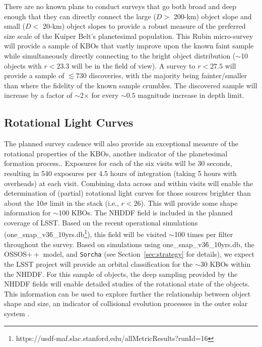 \documentclass[modern,linenumbers,trackchanges,preprint]{aastex631}
\begin{document}
There are no known plans to conduct surveys that go both broad and deep enough that they can directly connect the large ($D>$ 200-km) object slope and small ($D<$ 20-km) object slopes to provide a robust measure of the preferred size scale of the Kuiper Belt's planetesimal population.
This Rubin micro-survey will provide a sample of KBOs that vastly improve upon the known faint sample while simultaneously directly connecting to the bright object distribution ($\sim$10 objects with $r<23.3$ will be in the field of view). A survey to $r<27.5$ will provide a sample of $\lesssim 730$ discoveries, with the majority being fainter/smaller than where the fidelity of the known sample crumbles. The discovered sample will increase by a factor of $\sim$2$\times$ for every $\sim0.5$ magnitude increase in depth limit. 

\subsection{Rotational Light Curves}
The planned survey cadence will also provide an exceptional measure of the rotational properties of the KBOs, another indicator of the planetesimal formation process..
Exposures for each of the six visits will be 30 seconds, resulting in 540 exposures per 4.5 hours of integration (taking 5 hours with overheads) at each visit.  
Combining data across and within visits will enable the determination of (partial) rotational light curves \citep[see][for example]{Strauss24} for those sources brighter than about the 10$\sigma$ limit in the stack (i.e., $r<26$).  
This will provide some shape information for $\sim$100 KBOs. 
The NHDDF field is included in the planned coverage of LSST. Based on the recent operational simulations (one\_snap\_v3\.6\_10yrs.db\footnote{https://usdf-maf.slac.stanford.edu/allMetricResults?runId=16}), this field will be visited $\sim$100 times per filter throughout the survey.  
Based on simulations using one\_snap\_v3\.6\_10yrs.db, the OSSOS$++$ model, and \texttt{Sorcha} (see Section~\ref{sec:strategy} for details), we expect the LSST project will provide an orbital classification for the $\sim30$ KBOs within the NHDDF.  
For this sample of objects, the deep sampling provided by the NHDDF fields will enable detailed studies of the rotational state of the objects. This information can be used to explore further the relationship between object shape and size, an indicator of collisional evolution processes in the outer solar system \citep{Benechhi13}.
\end{document}
